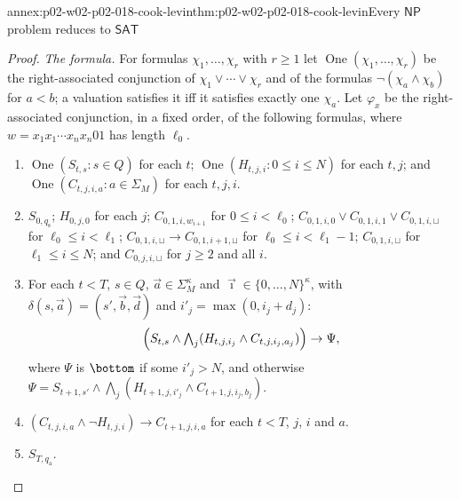 \begin{annexitem}{annex:p02-w02-p02-018-cook-levin}{thm:p02-w02-p02-018-cook-levin}{Every \(\mathsf{NP}\) problem reduces to \(\mathsf{SAT}\)}
\begin{proof}
\emph{The formula.}  For formulas \(\chi_1,\ldots,\chi_r\) with \(r\geq1\) let
\(\operatorname{One}(\chi_1,\ldots,\chi_r)\) be the right-associated
conjunction of \(\chi_1\lor\cdots\lor\chi_r\) and of the formulas
\(\neg(\chi_a\land\chi_b)\) for \(a<b\); a valuation satisfies it iff it
satisfies exactly one \(\chi_a\).  Let \(\varphi_x\) be the right-associated
conjunction, in a fixed order, of the following formulas, where
\(w=x_1x_1\cdots x_nx_n01\) has length \(\ell_0\).
\begin{enumerate}
\item[(E)] \(\operatorname{One}(S_{t,s}:s\in Q)\) for each \(t\);
      \(\operatorname{One}(H_{t,j,i}:0\leq i\leq N)\) for each \(t,j\); and
      \(\operatorname{One}(C_{t,j,i,a}:a\in\Sigma_M)\) for each \(t,j,i\).
\item[(I)] \(S_{0,q_{\mathrm s}}\); \(H_{0,j,0}\) for each \(j\);
      \(C_{0,1,i,w_{i+1}}\) for \(0\leq i<\ell_0\);
      \(C_{0,1,i,0}\lor C_{0,1,i,1}\lor C_{0,1,i,\sqcup}\) for
      \(\ell_0\leq i<\ell_1\);
      \(C_{0,1,i,\sqcup}\to C_{0,1,i+1,\sqcup}\) for
      \(\ell_0\leq i<\ell_1-1\); \(C_{0,1,i,\sqcup}\) for
      \(\ell_1\leq i\leq N\); and \(C_{0,j,i,\sqcup}\) for \(j\geq2\) and all
      \(i\).
\item[(D)] For each \(t<T\), \(s\in Q\), \(\vec a\in\Sigma_M^\kappa\) and
      \(\vec\imath\in\{0,\ldots,N\}^\kappa\), with
      \(\delta(s,\vec a)=(s',\vec b,\vec d)\) and
      \(i'_j=\max(0,i_j+d_j)\):
      \[
       \Bigl(S_{t,s}\land\textstyle\bigwedge_{j}
         (H_{t,j,i_j}\land C_{t,j,i_j,a_j})\Bigr)\to\Psi,
      \]
      where \(\Psi\) is \(\bottom\) if some \(i'_j>N\), and otherwise
      \(\Psi=S_{t+1,s'}\land\bigwedge_j(H_{t+1,j,i'_j}\land
      C_{t+1,j,i_j,b_j})\).
\item[(F)] \((C_{t,j,i,a}\land\neg H_{t,j,i})\to C_{t+1,j,i,a}\) for each
      \(t<T\), \(j\), \(i\) and \(a\).
\item[(A)] \(S_{T,q_{\mathrm a}}\).
\end{enumerate}


\end{proof}
\end{annexitem}
